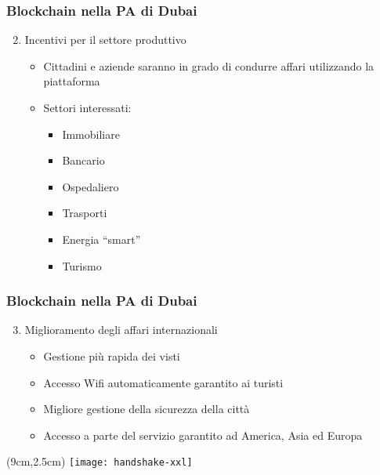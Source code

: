 \begin{frame}
 \frametitle{Blockchain nella PA di Dubai}

 \begin{enumerate}
 \setcounter{enumi}{1}
  \item<1-> Incentivi per il settore produttivo
  \begin{itemize}
   \item<2-> Cittadini e aziende saranno in grado di condurre affari
utilizzando la piattaforma
   \item<3-> Settori interessati:
   \begin{itemize}
    \item Immobiliare
    \item Bancario
    \item Ospedaliero
    \item Trasporti
    \item Energia ``smart''
    \item Turismo

   \end{itemize}

  \end{itemize}

 \end{enumerate}

\end{frame}

\begin{frame}
 \frametitle{Blockchain nella PA di Dubai}

 \begin{enumerate}
 \setcounter{enumi}{2}
  \item<1-> Miglioramento degli affari internazionali
  \begin{itemize}
   \item<2-> Gestione pi\`u rapida dei visti
   \item<3-> Accesso Wifi automaticamente garantito ai turisti
   \item<4-> Migliore gestione della sicurezza della citt\`a
   \item<5-> Accesso a parte del servizio garantito ad America, Asia ed Europa
  \end{itemize}

 \end{enumerate}
 
 
 \begin{textblock*}{5cm}(9cm,2.5cm)
  \texttt{[image: handshake-xxl]}
 \end{textblock*}

\end{frame}

